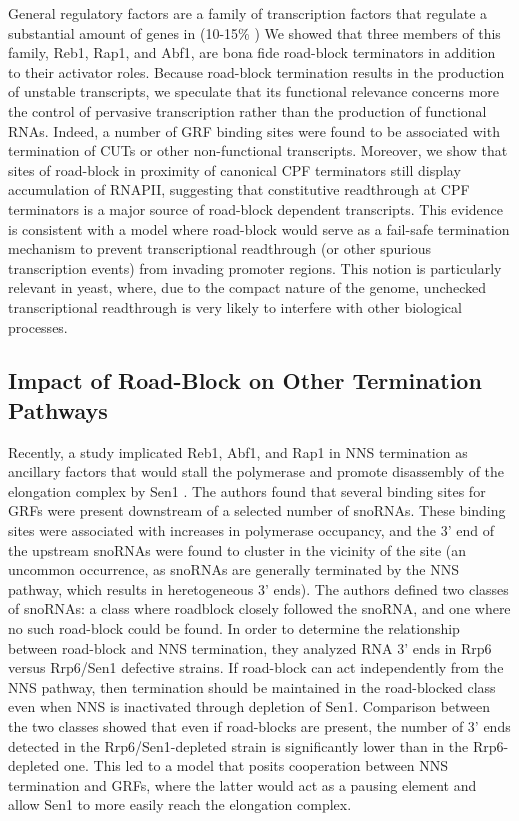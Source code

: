 General regulatory factors are a family of transcription factors that regulate a substantial amount of genes in \cer{} (10-15\% \cite{rhee:2011:comprehensive}) 
We showed that three members of this family, Reb1, Rap1, and Abf1, are bona fide road-block terminators in addition to their activator roles. 
Because road-block termination results in the production of unstable transcripts, we speculate that its functional relevance concerns more the control of pervasive transcription rather than the production of functional RNAs. 
Indeed, a number of GRF binding sites were found to be associated with termination of CUTs or other non-functional transcripts. 
Moreover, we show that sites of road-block in proximity of canonical CPF terminators still display accumulation of RNAPII, suggesting that constitutive readthrough at CPF terminators is a major source of road-block dependent transcripts. 
This evidence is consistent with a model where road-block would serve as a fail-safe termination mechanism to prevent transcriptional readthrough (or other spurious transcription events) from invading promoter regions. 
This notion is particularly relevant in yeast, where, due to the compact nature of the genome, unchecked transcriptional readthrough is very likely to interfere with other biological processes.  

\subsection{Impact of Road-Block on Other Termination Pathways}

Recently, a study implicated Reb1, Abf1, and Rap1 in NNS termination as ancillary factors that would stall the polymerase and promote disassembly of the elongation complex by Sen1 \cite{roy:2016:common}.
The authors found that several binding sites for GRFs were present downstream of a selected number of snoRNAs. 
These binding sites were associated with increases in polymerase occupancy, and the 3’ end of the upstream snoRNAs were found to cluster in the vicinity of the site (an uncommon occurrence, as snoRNAs are generally terminated by the NNS pathway, which results in heretogeneous 3’ ends). 
The authors defined two classes of snoRNAs: a class where roadblock closely followed the snoRNA, and one where no such road-block could be found.
In order to determine the relationship between road-block and NNS termination, they analyzed RNA 3' ends in Rrp6 versus Rrp6/Sen1 defective strains.
If road-block can act independently from the NNS pathway, then termination should be maintained in the road-blocked class even when NNS is inactivated through depletion of Sen1.
Comparison between the two classes showed that even if road-blocks are present, the number of 3' ends detected in the Rrp6/Sen1-depleted strain is significantly lower than in the Rrp6-depleted one.
This led to a model that posits cooperation between NNS termination and GRFs, where the latter would act as a pausing element and allow Sen1 to more easily reach the elongation complex.


